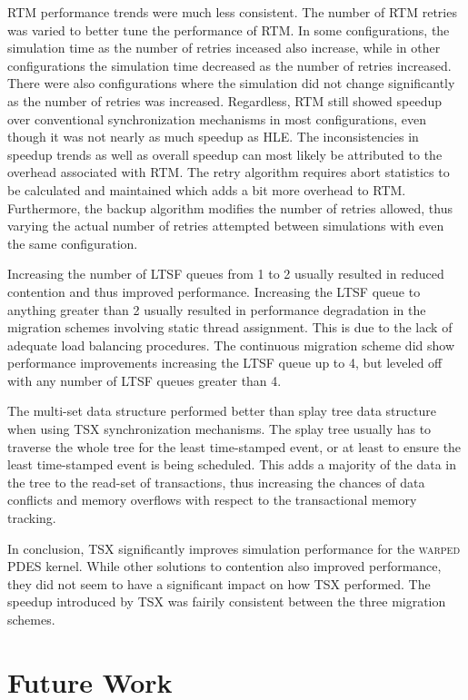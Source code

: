 \documentclass[11pt]{book}
\begin{document}
RTM performance trends were much less consistent.  The number of RTM retries was
varied to better tune the performance of RTM.  In some configurations, the
simulation time as the number of retries inceased also increase, while in other
configurations the simulation time decreased as the number of retries increased.
There were also configurations where the simulation did not change significantly
as the number of retries was increased.  Regardless, RTM still showed speedup
over conventional synchronization mechanisms in most configurations, even though
it was not nearly as much speedup as HLE.  The inconsistencies in speedup trends
as well as overall speedup can most likely be attributed to the overhead
associated with RTM.  The retry algorithm requires abort statistics to be
calculated and maintained which adds a bit more overhead to RTM.  Furthermore,
the backup algorithm modifies the number of retries allowed, thus varying the
actual number of retries attempted between simulations with even the same
configuration.

Increasing the number of LTSF queues from 1 to 2 usually resulted in reduced
contention and thus improved performance.  Increasing the LTSF queue to anything
greater than 2 usually resulted in performance degradation in the migration
schemes involving static thread assignment.  This is due to the
lack of adequate load balancing procedures.  The continuous migration scheme did
show performance improvements increasing the LTSF queue up to 4, but leveled
off with any number of LTSF queues greater than 4.  

The multi-set data structure performed better than splay tree data structure
when using TSX synchronization mechanisms.  The splay tree usually has to
traverse the whole tree for the least time-stamped event, or at least to ensure
the least time-stamped event is being scheduled.  This adds a majority of the
data in the tree to the read-set of transactions, thus increasing the chances of
data conflicts and memory overflows with respect to the transactional memory
tracking.

In conclusion, TSX significantly improves simulation performance for the
\textsc{warped} PDES kernel.  While other solutions to contention also improved
performance, they did not seem to have a significant impact on how TSX
performed.  The speedup introduced by TSX was fairily consistent between the
three migration schemes.

\section{Future Work}
\end{document}
